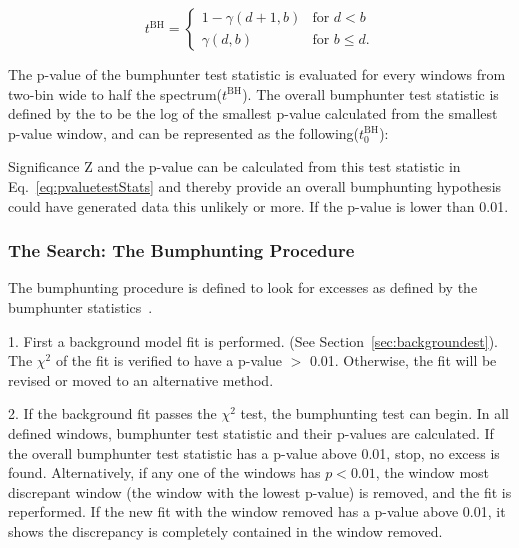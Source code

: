 \begin{equation}
    t^{\textrm{BH}}=
    \begin{cases} 1-\gamma(d+1, b) &  \textrm{for $d < b$}
    \\
    \gamma(d,b) &  \textrm{for $b \leq d$}.
    \end{cases}
\end{equation}
    

    The p-value of the bumphunter test statistic is evaluated for every windows from two-bin wide to half the spectrum($t^{\textrm{BH}}$). The overall bumphunter test statistic is defined by the to be the log of the smallest p-value calculated from the smallest p-value window, and can be represented as the following($t^{\textrm{BH}}_{0}$):


    Significance Z and the p-value can be calculated from this test statistic in Eq.~\ref{eq:pvaluetestStats} and thereby provide an overall bumphunting hypothesis could have generated data this unlikely or more. If the p-value is lower than 0.01. %


    \subsubsection{The Search: The Bumphunting Procedure}
    The bumphunting procedure is defined to look for excesses as defined by the bumphunter statistics~\cite{Pachal:2063032}.

    1.  First a background model fit is performed. (See Section~\ref{sec:backgroundest}). The $\chi^{2}$ of the fit is verified to have a p-value $>$ 0.01. Otherwise, the fit will be revised or moved to an alternative method.

    2.  If the background fit passes the $\chi^{2}$ test, the bumphunting test can begin. In all defined windows, bumphunter test statistic and their p-values are calculated. If the overall bumphunter test statistic has a p-value above 0.01, stop, no excess is found. Alternatively, if any one of the windows has  $p< 0.01$, the window most discrepant window (the window with the lowest p-value) is removed, and the fit is reperformed. If the new fit with the window removed has a p-value above 0.01, it shows the discrepancy is completely contained in the window removed.

